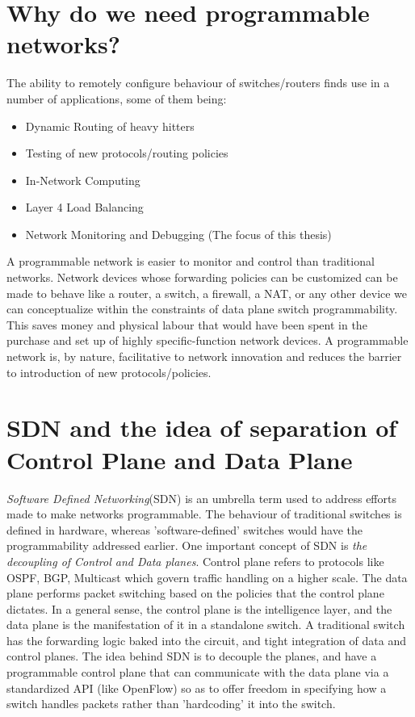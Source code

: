 \section{Why do we need programmable networks?}
The ability to remotely configure behaviour of switches/routers finds use in a number of applications,
some of them being:
\begin{itemize}
  \item Dynamic Routing of heavy hitters
  \item Testing of new protocols/routing policies
  \item In-Network Computing
  \item Layer 4 Load Balancing
  \item Network Monitoring and Debugging (The focus of this thesis)
\end{itemize}
A programmable network is easier to monitor and control than traditional networks. Network devices whose forwarding 
policies can be customized can be made to behave like a router, a switch, a firewall, a NAT, or any other device we can 
conceptualize within the constraints of data plane switch programmability. This saves money and physical labour that would have been
spent in the purchase and set up of highly specific-function network devices. A programmable network is, by nature, facilitative
to network innovation and reduces the barrier to introduction of new protocols/policies.

\section{SDN and the idea of separation of Control Plane and Data Plane}
\emph{Software Defined Networking}(SDN) is an umbrella term used to address efforts made to make networks programmable. The behaviour of
traditional switches is defined in hardware, whereas 'software-defined' switches would have the programmability addressed
earlier. One important concept of SDN is \textit{the decoupling of Control and Data planes}.
Control plane refers to protocols like OSPF, BGP, Multicast which govern traffic handling on a higher scale. The 
data plane performs packet switching based on the policies that the control plane dictates. In a general sense, the control
plane is the intelligence layer, and the data plane is the manifestation of it in a standalone switch.
\newline
A traditional switch has the forwarding logic baked into the circuit, and tight integration of data and control planes.
The idea behind SDN is to decouple the planes, and have a programmable control plane that can communicate with the data plane
via a standardized API (like OpenFlow) so as to offer freedom in specifying how a switch handles packets rather than 'hardcoding'
it into the switch.

